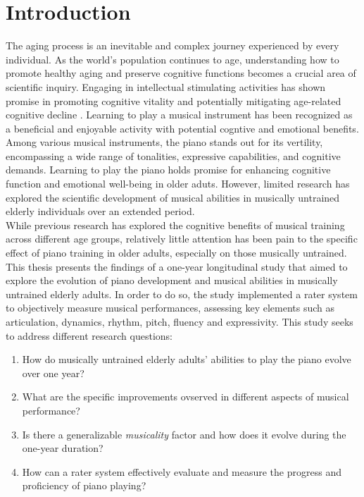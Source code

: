 \chapter{Introduction}

The aging process is an inevitable and complex journey experienced by every individual. As the world's population continues to age, understanding how to promote healthy aging and preserve cognitive functions becomes a crucial area of scientific inquiry. Engaging in intellectual stimulating activities has shown promise in promoting cognitive vitality and potentially mitigating age-related cognitive decline \cite{Verghese2003}. Learning to play a musical instrument has been recognized as a beneficial and enjoyable activity with potential cogntive and emotional benefits. Among various musical instruments, the piano stands out for its vertility, encompassing a wide range of tonalities, expressive capabilities, and cognitive demands. Learning to play the piano holds promise for enhancing cognitive function and emotional well-being in older aduts. However, limited research has explored the scientific development of musical abilities in musically untrained elderly individuals over an extended period.\\
While previous research has explored the cognitive benefits of musical training across different age groups, relatively little attention has been pain to the specific effect of piano training in older adults, especially on those musically untrained. This thesis presents the findings of a one-year longitudinal study that aimed to explore the evolution of piano development and musical abilities in musically untrained elderly adults. In order to do so, the study implemented a rater system to objectively measure musical performances, assessing key elements such as articulation, dynamics, rhythm, pitch, fluency and expressivity. 
This study seeks to address different research questions: 
\begin{enumerate}
\item How do musically untrained elderly adults' abilities to play the piano evolve over one year?
\item What are the specific improvements ovserved in different aspects of musical performance?
\item Is there a generalizable \textit{musicality} factor and how does it evolve during the one-year duration?
\item How can a rater system effectively evaluate and measure the progress and proficiency of piano playing?
\end{enumerate}

